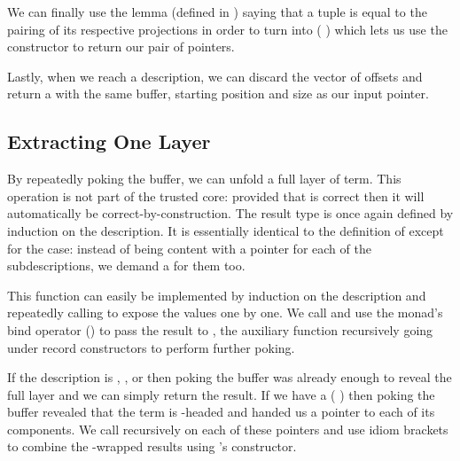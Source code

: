 We can finally use the lemma 
(defined in ) saying that a tuple
is equal to the pairing of its respective projections
in order to turn  into
(  \IdrisData{\#}  )
which lets us use the  constructor \IdrisData{(\#)} to return our
pair of pointers.


Lastly, when we reach a  description, we can discard the
vector of offsets and return a  with the same buffer,
starting position and size as our input pointer.

\subsection{Extracting One Layer}

By repeatedly poking the buffer, we can unfold a full layer of term.
This operation is not part of the trusted core: provided that
 is correct then it will automatically be
correct-by-construction.
The result type is once again defined by induction on the description.
It is essentially identical to the definition of
 except for the  case:
instead of being content with a pointer for each of the
subdescriptions, we demand a  for them too.


This function can easily be implemented by induction on the description
and repeatedly calling  to expose the values one by
one.
%
We call  and use the  monad's bind
operator (\IdrisFunction{>>=}) to pass the result to ,
the auxiliary function recursively going under record constructors to
perform further poking.


If the description is , , or
 then poking the buffer was already enough to
reveal the full layer and we can simply return the result.
%
If we have a (  )
then poking the buffer revealed that the term is \IdrisData{(\#)}-headed
and handed us a pointer to each of its components.
%
We call  recursively on each of these pointers and
use idiom brackets to combine the -wrapped results
using 's \IdrisData{(\#)} constructor.

